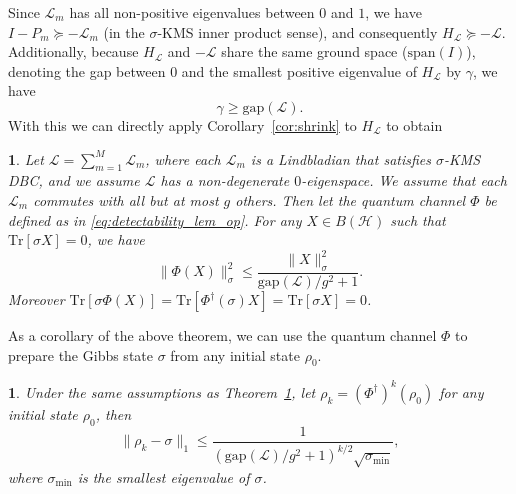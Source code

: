 \documentclass{article}
\newtheorem{thm}{\protect\theoremname}
\theoremstyle{plain}
\theoremstyle{plain}
\theoremstyle{plain}
\theoremstyle{plain}
\theoremstyle{plain}
\theoremstyle{plain}
\newtheorem{cor}{\protect\corollaryname}
\theoremstyle{plain}
\providecommand{\corollaryname}{Corollary}
\providecommand{\theoremname}{Theorem}
\newcommand{\Tr}{\mathrm{Tr}}
\begin{document}
Since $\mathcal{L}_m$ has all non-positive eigenvalues between $0$ and $1$, we have $I-P_m\succeq -\mathcal{L}_m$ (in the $\sigma$-KMS inner product sense), and consequently $H_{\mathcal{L}}\succeq -\mathcal{L}$. Additionally, because $H_{\mathcal{L}}$ and $-\mathcal{L}$ share the same ground space ($\mathrm{span}(I)$), denoting the gap between $0$ and the smallest positive eigenvalue of $H_{\mathcal{L}}$ by $\gamma$, we have
\begin{equation}
    \gamma \geq \mathrm{gap}(\mathcal{L}).
\end{equation}
With this we can directly apply Corollary~\ref{cor:shrink} to $H_{\mathcal{L}}$ to obtain
\begin{thm}
    \label{thm:quantum_gibbs_sampler_shrink}
    Let $\mathcal{L}=\sum_{m=1}^M \mathcal{L}_m$, where each $\mathcal{L}_m$ is a Lindbladian that satisfies $\sigma$-KMS DBC, and we assume $\mathcal{L}$ has a non-degenerate $0$-eigenspace. We assume that each $\mathcal{L}_m$ commutes with all but at most $g$ others. Then let the quantum channel $\Phi$ be defined as in \eqref{eq:detectability_lem_op}. For any $X\in B(\mathcal{H})$ such that $\Tr[\sigma X]=0$, we have
    \[
    \|\Phi(X)\|_\sigma^2\leq \frac{\|X\|_\sigma^2}{\mathrm{gap}(\mathcal{L})/g^2+1}.
    \]
    Moreover $\Tr[\sigma \Phi(X)]=\Tr[\Phi^\dag(\sigma) X]=\Tr[\sigma X]=0$.
\end{thm}

As a corollary of the above theorem, we can use the quantum channel $\Phi$ to prepare the Gibbs state $\sigma$ from any initial state $\rho_0$.
\begin{cor}
    \label{cor:prepare_gibbs_state_quantum_gibbs_sampler}
    Under the same assumptions as Theorem~\ref{thm:quantum_gibbs_sampler_shrink}, let $\rho_k=(\Phi^\dag)^k(\rho_0)$ for any initial state $\rho_0$, then
    \[
    \|\rho_k-\sigma\|_1\leq \frac{1}{(\mathrm{gap}(\mathcal{L})/g^2+1)^{k/2}\sqrt{\sigma_{\min}}},
    \]
    where $\sigma_{\min}$ is the smallest eigenvalue of $\sigma$.
\end{cor}
\end{document}
